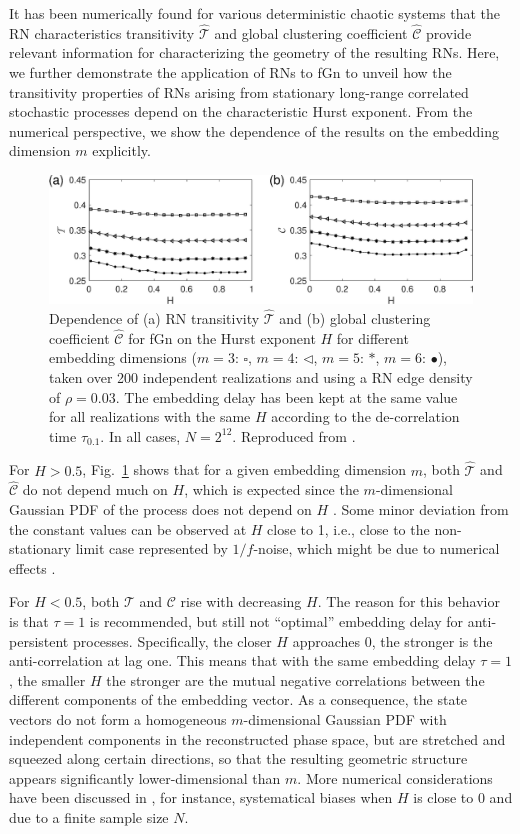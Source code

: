 It has been numerically found for various deterministic chaotic systems that the RN characteristics transitivity $\hat{\mathcal{T}}$ and global clustering coefficient $\hat{\mathcal{C}}$ provide relevant information for characterizing the geometry of the resulting RNs. Here, we further demonstrate the application of RNs to fGn to unveil how the transitivity properties of RNs arising from stationary long-range correlated stochastic processes depend on the characteristic Hurst exponent. From the numerical perspective, we show the dependence of the results on the embedding dimension $m$ explicitly.
		\begin{figure}
			\centering
			\includegraphics[width=\columnwidth]{Chapter03_RecurrenceNt/netRec4DimiHP.eps}
		\caption{Dependence of (a) RN transitivity $\hat{\mathcal{T}}$ and (b) global clustering coefficient $\hat{\mathcal{C}}$ for fGn on the Hurst exponent $H$ for different embedding dimensions ($m=3$: $\square$, $m=4$: $\triangleleft$, $m=5$: $\ast$, $m=6$: $\bullet$), taken over 200 independent realizations and using a RN edge density of $\rho=0.03$. The embedding delay has been kept at the same value for all realizations with the same $H$ according to the de-correlation time $\tau_{0.1}$. In all cases, $N=2^{12}$. Reproduced from \cite{Zou2015}.  \label{fig:fgn_trans_H}}
\end{figure}

		For $H>0.5$, Fig.~\ref{fig:fgn_trans_H} shows that for a given embedding dimension $m$, both $\hat{\mathcal{T}}$ and $\hat{\mathcal{C}}$ do not depend much on $H$, which is expected since the $m$-dimensional Gaussian PDF of the process does not depend on $H$ \cite{Donges2012,Zou2015}. Some minor deviation from the constant values can be observed at $H$ close to 1, i.e., close to the non-stationary limit case represented by $1/f$-noise, which might be due to numerical effects \cite{Zou2015}.

		For $H<0.5$, both $\mathcal{T}$ and $\mathcal{C}$ rise with decreasing $H$. The reason for this behavior is that $\tau=1$ is recommended, but still not ``optimal'' embedding delay for anti-persistent processes. Specifically, the closer $H$ approaches 0, the stronger is the anti-correlation at lag one. This means that with the same embedding delay $\tau=1$, the smaller $H$ the stronger are the mutual negative correlations between the different components of the embedding vector. As a consequence, the state vectors do not form a homogeneous $m$-dimensional Gaussian PDF with independent components in the reconstructed phase space, but are stretched and squeezed along certain directions, so that the resulting geometric structure appears significantly lower-dimensional than $m$. More numerical considerations have been discussed in \cite{Zou2015}, for instance, systematical biases when $H$ is close to $0$ and due to a finite sample size $N$.


